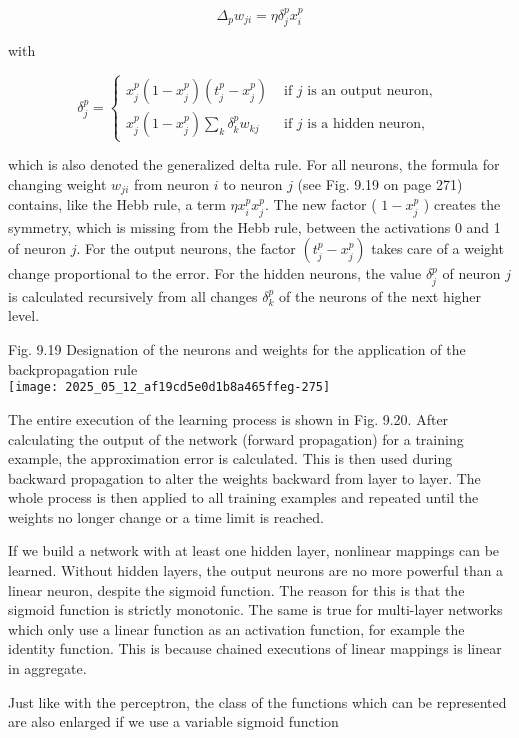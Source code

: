 \documentclass[10pt]{article}
\begin{document}
$$
\Delta_{p} w_{j i}=\eta \delta_{j}^{p} x_{i}^{p}
$$

with

$$
\delta_{j}^{p}= \begin{cases}x_{j}^{p}\left(1-x_{j}^{p}\right)\left(t_{j}^{p}-x_{j}^{p}\right) & \text { if } j \text { is an output neuron, } \\ x_{j}^{p}\left(1-x_{j}^{p}\right) \sum_{k} \delta_{k}^{p} w_{k j} & \text { if } j \text { is a hidden neuron, }\end{cases}
$$

which is also denoted the generalized delta rule. For all neurons, the formula for changing weight $w_{j i}$ from neuron $i$ to neuron $j$ (see Fig. 9.19 on page 271) contains, like the Hebb rule, a term $\eta x_{i}^{p} x_{j}^{p}$. The new factor ( $1-x_{j}^{p}$ ) creates the symmetry, which is missing from the Hebb rule, between the activations 0 and 1 of neuron $j$. For the output neurons, the factor $\left(t_{j}^{p}-x_{j}^{p}\right)$ takes care of a weight change proportional to the error. For the hidden neurons, the value $\delta_{j}^{p}$ of neuron $j$ is calculated recursively from all changes $\delta_{k}^{p}$ of the neurons of the next higher level.

Fig. 9.19 Designation of the neurons and weights for the application of the backpropagation rule\\
\texttt{[image: 2025\_05\_12\_af19cd5e0d1b8a465ffeg-275]}

The entire execution of the learning process is shown in Fig. 9.20. After calculating the output of the network (forward propagation) for a training example, the approximation error is calculated. This is then used during backward propagation to alter the weights backward from layer to layer. The whole process is then applied to all training examples and repeated until the weights no longer change or a time limit is reached.

If we build a network with at least one hidden layer, nonlinear mappings can be learned. Without hidden layers, the output neurons are no more powerful than a linear neuron, despite the sigmoid function. The reason for this is that the sigmoid function is strictly monotonic. The same is true for multi-layer networks which only use a linear function as an activation function, for example the identity function. This is because chained executions of linear mappings is linear in aggregate.

Just like with the perceptron, the class of the functions which can be represented are also enlarged if we use a variable sigmoid function
\end{document}
